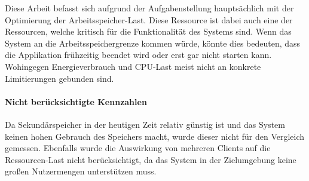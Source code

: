 Diese Arbeit befasst sich aufgrund der Aufgabenstellung hauptsächlich mit der Optimierung der Arbeitsspeicher-Last.
Diese Ressource ist dabei auch eine der Ressourcen, welche kritisch für die Funktionalität des Systems sind.
Wenn das System an die Arbeitsspeichergrenze kommen würde, könnte dies bedeuten, dass die Applikation frühzeitig beendet wird oder erst gar nicht starten kann.
Wohingegen Energieverbrauch und CPU-Last meist nicht an konkrete Limitierungen gebunden sind.

\paragraph*{Nicht berücksichtigte Kennzahlen}

Da Sekundärspeicher in der heutigen Zeit relativ günstig ist und das System keinen hohen Gebrauch des Speichers macht, wurde dieser nicht für den Vergleich gemessen.
Ebenfalls wurde die Auswirkung von mehreren Clients auf die Ressourcen-Last nicht berücksichtigt, da das System in der Zielumgebung keine großen Nutzermengen unterstützen muss.
\newpage


